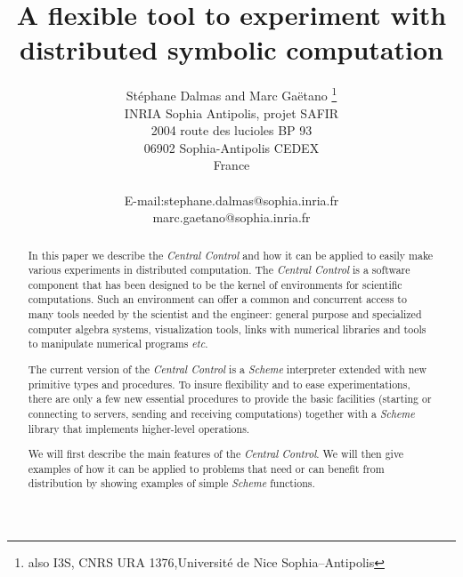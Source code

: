 


\title{
A flexible tool to experiment with distributed symbolic computation
}

\author{
        St\'ephane Dalmas and Marc Ga\"etano
        \thanks{also I3S, CNRS URA 1376,Universit\'e 
                          de Nice Sophia--Antipolis}\\
        {\small INRIA Sophia Antipolis, projet SAFIR} \\
        {\small 2004 route des lucioles }
         {\small BP 93} \\
         {\small 06902 Sophia-Antipolis {\sc CEDEX}} \\
         {\small France } \\
         {\small 
          \begin{tabular} {ll}
            E-mail:& stephane.dalmas@sophia.inria.fr\\
                   & marc.gaetano@sophia.inria.fr
          \end{tabular} 
         }
}



 

\maketitle

\begin{abstract}
In this paper we describe the {\em Central Control\/} and how it can be
applied to easily make various experiments in distributed computation. 
The {\em Central Control\/} is a software component that has been designed to
be the kernel of  environments for scientific computations. 
Such an environment can offer a common and concurrent access to many tools
needed by the scientist and the engineer: general purpose and specialized
computer algebra systems, visualization tools, links with numerical libraries
and tools to manipulate numerical programs {\sl etc}.

The current version of the {\em Central Control\/} is a {\em Scheme\/}
interpreter extended with new primitive types and procedures. 
To insure flexibility and to ease experimentations, there are only a few new
essential procedures to provide the basic facilities (starting or connecting
to servers, sending and receiving computations) together with a {\em Scheme}
library that implements higher-level operations.

We will first describe the main features of the {\em Central Control\/}. We
will then give examples of how it can be applied to problems that need or can
benefit from distribution by showing examples of simple {\em Scheme}
functions.  

\end{abstract} 



 
